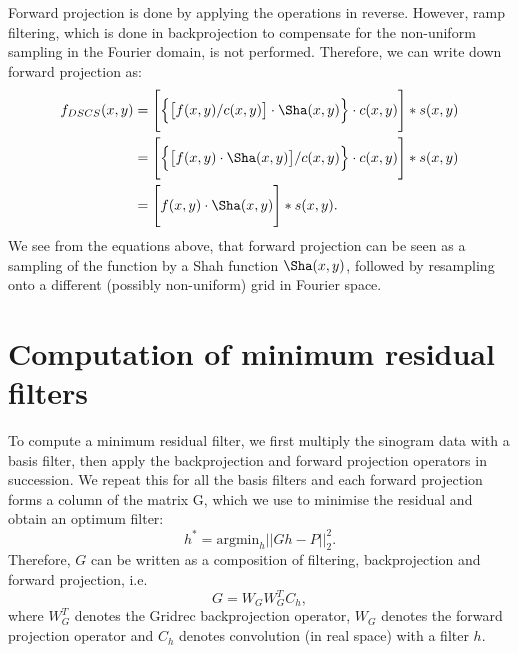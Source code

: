 \documentclass[11pt]{article}
\begin{document}
Forward projection is done by applying the operations in reverse. However, ramp filtering, which is done in backprojection to compensate for the non-uniform sampling in the Fourier domain, is not performed. Therefore, we can write down forward projection as:
{\color{gray}
\begin{align}
f_{DSCS}(x,y) &= \Bigg[\Big\{\big[f(x,y) / c(x,y)\big] \cdot \Sha(x,y)\Big\} \cdot c(x,y)\Bigg] \ast s(x,y) \\
&= \Bigg[\Big\{\big[f(x,y) \cdot \Sha(x,y)\big] / c(x,y) \Big\} \cdot c(x,y)\Bigg] \ast s(x,y) \\
&= \Bigg[f(x,y) \cdot \Sha(x,y) \Bigg] \ast s(x,y).
\end{align}
We see from the equations above, that forward projection can be seen as a sampling of the function by a Shah function $\Sha(x,y)$, followed by resampling onto a different (possibly non-uniform) grid in Fourier space.
}

\section{Computation of minimum residual filters}
To compute a minimum residual filter, we first multiply the sinogram data with a basis filter, then apply the backprojection and forward projection operators in succession. We repeat this for all the basis filters and each forward projection forms a column of the matrix G, which we use to minimise the residual and obtain an optimum filter:
\begin{equation}
h^\ast = \text{argmin}_h ||Gh - P||^2_2.
\end{equation}
Therefore, $G$ can be written as a composition of filtering, backprojection and forward projection, i.e.
\begin{equation}
G = W_G W^T_G C_h,
\end{equation}
where $W^T_G$ denotes the Gridrec backprojection operator, $W_G$ denotes the forward projection operator and $C_h$ denotes convolution (in real space) with a filter $h$. 
\end{document}
